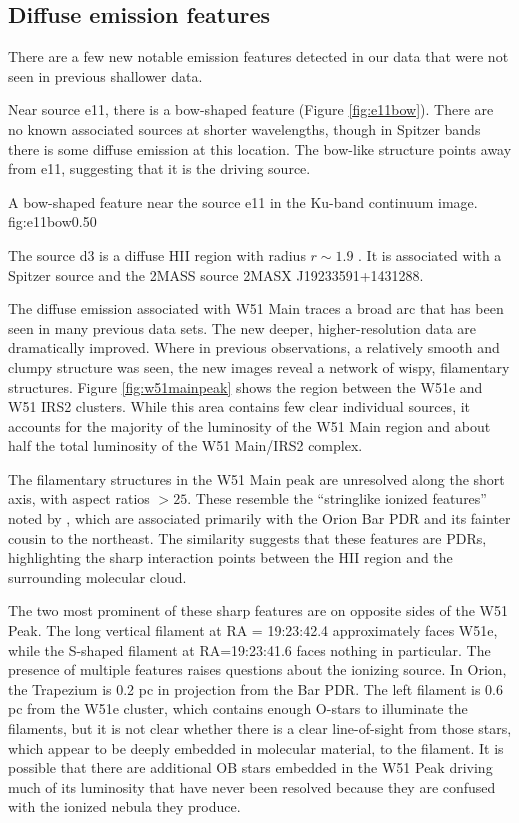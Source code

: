 \subsection{Diffuse emission features}
There are a few new notable emission features detected in our data that were
not seen in previous shallower data.

Near source e11, there is a bow-shaped feature (Figure \ref{fig:e11bow}).
There are no known associated sources at shorter wavelengths, though in Spitzer
bands there is some diffuse emission at this location.  The bow-like structure
points away from e11, suggesting that it is the driving source.

{A bow-shaped feature near the source e11 in the Ku-band continuum image.}
{fig:e11bow}{0.5}{0}

The source d3 is a diffuse HII region with radius $r\sim1.9$ \arcsec.  It is
associated with a Spitzer source and the 2MASS source 2MASX J19233591+1431288.

The diffuse emission associated with W51 Main traces a broad arc that has been
seen in many previous data sets.  The new deeper, higher-resolution data are
dramatically improved.  Where in previous observations, a relatively smooth and
clumpy structure was seen, the new images reveal a network of wispy,
filamentary structures.  Figure \ref{fig:w51mainpeak} shows the region between
the W51e and W51 IRS2 clusters.  While this area contains few clear individual
sources, it accounts for the majority of the luminosity of the W51 Main region
and about half the total luminosity of the W51 Main/IRS2 complex.  

The filamentary structures in the W51 Main peak are unresolved along the short
axis, with aspect ratios $>25$.   These resemble the ``stringlike ionized
features'' noted by \citet[][see
\url{http://images.nrao.edu/402}]{Yusef-Zadeh1990a}, which are associated
primarily with the Orion Bar PDR and its fainter cousin to the northeast.  The
similarity suggests that these features are PDRs, highlighting the sharp
interaction points between the HII region and the surrounding molecular cloud.

The two most prominent of these sharp features are on opposite sides of the W51
Peak.  The long vertical filament at RA = 19:23:42.4 approximately faces W51e,
while the S-shaped filament at RA=19:23:41.6 faces nothing in particular.  The
presence of multiple features raises questions about the ionizing source.  In
Orion, the Trapezium is 0.2 pc in projection from the Bar PDR.  The left
filament is 0.6 pc from the W51e cluster, which contains enough O-stars to
illuminate the filaments, but it is not clear whether there is a clear
line-of-sight from those stars, which appear to be deeply embedded in molecular
material, to the filament.  It is possible that there are additional OB stars
embedded in the W51 Peak driving much of its luminosity that have never been
resolved because they are confused with the ionized nebula they produce.

